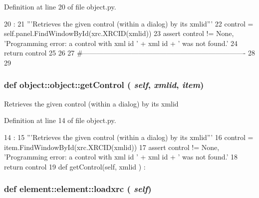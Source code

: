 Definition at line 20 of file object.py.


\begin{DoxyCode}
20                                  :
21         '''Retrieves the given control (within a dialog) by its xmlid'''
22         control = self.panel.FindWindowById(xrc.XRCID(xmlid))
23         assert control != None, 'Programming error: a control with xml id ' + xml
      id + ' was not found.'
24         return control
25 
26                 
27 #----------------------------------------------------------------------
28 
29     
    
\end{DoxyCode}
\hypertarget{classobject_1_1object_ac765747a2b581d48eeb94e600c31fc3f}{
\subsubsection[{getControl}]{\setlength{\rightskip}{0pt plus 5cm}def object::object::getControl ( {\em self}, \/   {\em xmlid}, \/   {\em item})}}
\label{classobject_1_1object_ac765747a2b581d48eeb94e600c31fc3f}
\begin{DoxyVerb}Retrieves the given control (within a dialog) by its xmlid\end{DoxyVerb}
 

Definition at line 14 of file object.py.


\begin{DoxyCode}
14                                        :
15         '''Retrieves the given control (within a dialog) by its xmlid'''
16         control = item.FindWindowById(xrc.XRCID(xmlid))
17         assert control != None, 'Programming error: a control with xml id ' + xml
      id + ' was not found.'
18         return control
19 
    def getControl(self, xmlid ) :
\end{DoxyCode}
\hypertarget{classelement_1_1element_a917516054d0cd3a641c57be859dbe370}{
\subsubsection[{loadxrc}]{\setlength{\rightskip}{0pt plus 5cm}def element::element::loadxrc ( {\em self})}}
\label{classelement_1_1element_a917516054d0cd3a641c57be859dbe370}


